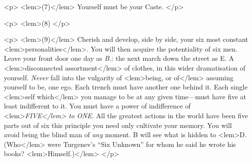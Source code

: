 {{				<p>
				\vspace{10pt}
				\noindent
<lem>(7)</lem>{}\hspace{20pt} Yourself must be your Caste. 
 				</p> 

				<p>
				\vspace{10pt}
				\noindent
<lem>(8) 
					{}
 				</p> 

				<p>
				\vspace{10pt}
				\noindent
<lem>(9)</lem>{}\hspace{20pt} Cherish and develop, 
				side by side, your six most constant 
<lem>personalities</lem>{}. You will 
				then acquire the potentiality of six men. Leave your front door one day as \emph{B.}: the 
				next march down the street as E. A 
<lem>disconnected assortment</lem>
					{} 
				of clothes,  
					{}
				in this wider dramatisation of yourself. \emph{Never} fall into the vulgarity 
				of 
<lem>being, or of</lem> 
					{}
				assuming yourself to be, one ego. Each trench must have another one behind 
				it. Each single 
<lem>self which</lem> 
					{}
				you manage to be at any given time---must have five at 
				least indifferent to it. You must have a power of indifference of 
<lem>\emph{FIVE</lem> to \emph{ONE}.} 
				{} 
				All 
the greatest actions in the world have been five parts out of six  
					{}
				this principle you need only cultivate 
				your memory. You will avoid being the blind man of \emph{any} moment. B will see what is 
				hidden to 
<lem>D. (Who</lem> 
					{}
				were Turgenev's “Six Unknown” for whom he said he wrote his 
				books? 
<lem>Himself.)</lem> 
					{}
 				</p> 

}}
